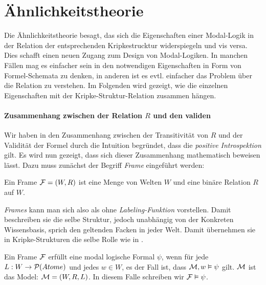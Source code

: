\section{Ähnlichkeitstheorie} %
\label{sub:Aehnlichkeitstheorie}

Die Ähnlichkeitstheorie besagt, das sich die Eigenschaften einer Modal-Logik in der Relation der entsprechenden Kripkestrucktur widerspiegeln und vis versa. 
Dies schafft einen neuen Zugang zum Design von Modal-Logiken. 
In manchen Fällen mag es einfacher sein in den notwendigen Eigenschaften in Form von Formel-Schemata zu denken, in anderen ist es evtl. einfacher das Problem über die Relation zu verstehen. 
Im Folgenden wird gezeigt, wie die einzelnen Eigenschaften mit der Kripke-Struktur-Relation zusammen hängen.


\paragraph{Zusammenhang zwischen der Relation $R$ und den validen \formelSchemata}

Wir haben in  den Zusammenhang zwischen der Transitivität von $R$ und der Validität der Formel \vierFormel durch die Intuition begründet, dass die \emph{positive Introspektion} gilt.
Es wird nun gezeigt, dass sich dieser Zusammenhang mathematisch beweisen lässt.
Dazu muss zunächst der Begriff \emph{Frame} eingeführt werden:

\begin{definition}
	\label{def:frame}
	Ein Frame $\mathcal{F} = (W,R)$ ist eine Menge von Welten $W$ und eine binäre Relation $R$ auf $W$.
	\cite[S.322]{huth2004logic}
\end{definition}

\emph{Frames} kann man sich also als \KS ohne \emph{Labeling-Funktion} vorstellen.
Damit beschreiben sie die selbe Struktur, jedoch unabhängig von der Konkreten Wissensbasis, sprich den geltenden Facken in jeder Welt.
Damit übernehmen sie in Kripke-Strukturen die selbe Rolle wie \formelSchemata in \MLFn .

\begin{definition}
	\label{def:frame_erfuellt}
	Ein Frame $\mathcal{F}$ erfüllt eine modal logische Formal $\psi$, wenn für jede  $L: W \rightarrow \mathcal{P}(Atome)$ und jedes $w \in W$, es der Fall ist, dass $\mathcal{M},w \vDash \psi$ gilt. $\mathcal{M}$ ist das Model: $\mathcal{M} = (W,R,L)$.
	In diesem Falle schreiben wir $\mathcal{F} \vDash \psi$.
	\cite[S.322f]{huth2004logic}
\end{definition}


